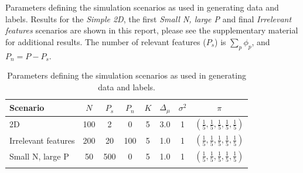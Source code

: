 \documentclass{bioinfo}
\begin{document}
\begin{table}[ht]
	\centering
	\caption{Parameters defining the simulation scenarios as used in generating data and labels. Results for the \emph{Simple 2D}, the first \emph{Small N, large P} and final \emph{Irrelevant features} scenarios are shown in this report, please see the supplementary material for additional results. The number of relevant features (\(P_s\)) is $\sum_p \phi_p$, and $P_n = P - P_s$.}
	\begin{tabular}{l|ccccccc}
		\toprule
		\textbf{Scenario} & $N$ & $P_s$ & $P_n$ & $K$ & $\Delta_{\mu}$ & $\sigma^2$ & $\pi$\\
		\midrule
		2D & 100 & 2 & 0 & 5 & 3.0 & 1 &  $(\frac{1}{5} , \frac{1}{5}, \frac{1}{5}, \frac{1}{5}, \frac{1}{5})$ \\
		Irrelevant features & 200 & 20 & 100 & 5 & 1.0 & 1 &  $(\frac{1}{5} , \frac{1}{5}, \frac{1}{5}, \frac{1}{5}, \frac{1}{5})$\\
		Small N, large P & 50 & 500 & 0 & 5 & 1.0 & 1 &  $(\frac{1}{5} , \frac{1}{5}, \frac{1}{5}, \frac{1}{5}, \frac{1}{5})$\\
		\botrule
	\end{tabular}
	\caption{Parameters defining the simulation scenarios as used in generating data and labels.}
	\label{table:scenarioTable}
\end{table}%
\end{document}
